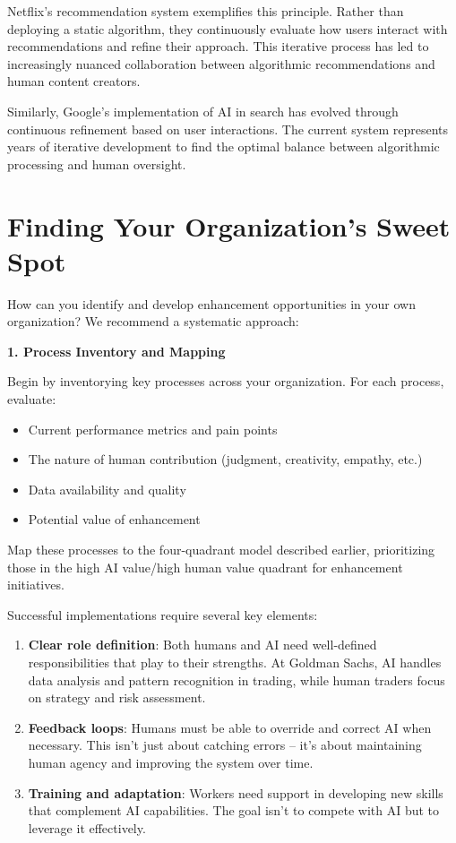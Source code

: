 \documentclass[
  Letterpaper,
]{scrbook}
\begin{document}
Netflix's recommendation system exemplifies this principle. Rather than
deploying a static algorithm, they continuously evaluate how users
interact with recommendations and refine their approach. This iterative
process has led to increasingly nuanced collaboration between
algorithmic recommendations and human content creators.

Similarly, Google's implementation of AI in search has evolved through
continuous refinement based on user interactions. The current system
represents years of iterative development to find the optimal balance
between algorithmic processing and human oversight.

\section{Finding Your Organization's Sweet
Spot}\label{finding-your-organizations-sweet-spot}

How can you identify and develop enhancement opportunities in your own
organization? We recommend a systematic approach:

\textbf{1. Process Inventory and Mapping}

Begin by inventorying key processes across your organization. For each
process, evaluate:

\begin{itemize}
\item
  Current performance metrics and pain points
\item
  The nature of human contribution (judgment, creativity, empathy, etc.)
\item
  Data availability and quality
\item
  Potential value of enhancement
\end{itemize}

Map these processes to the four-quadrant model described earlier,
prioritizing those in the high AI value/high human value quadrant for
enhancement initiatives.

Successful implementations require several key elements:

\begin{enumerate}
\def\labelenumi{\arabic{enumi}.}
\item
  \textbf{Clear role definition}: Both humans and AI need well-defined
  responsibilities that play to their strengths. At Goldman Sachs, AI
  handles data analysis and pattern recognition in trading, while human
  traders focus on strategy and risk assessment.
\item
  \textbf{Feedback loops}: Humans must be able to override and correct
  AI when necessary. This isn't just about catching errors -- it's about
  maintaining human agency and improving the system over time.
\item
  \textbf{Training and adaptation}: Workers need support in developing
  new skills that complement AI capabilities. The goal isn't to compete
  with AI but to leverage it effectively.
\end{enumerate}
\end{document}
